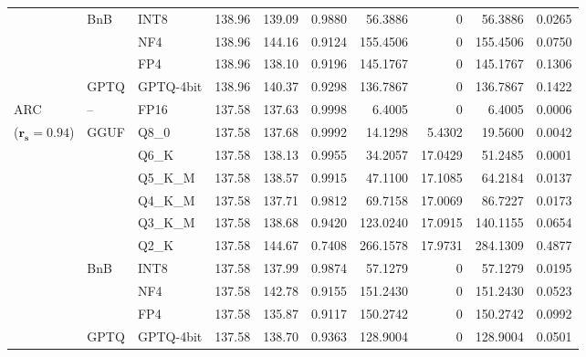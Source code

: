 \begin{longtable}{ll l rrrrrrr}
 & BnB & INT8 & 138.96 & 139.09 & 0.9880 & 56.3886 & \cellcolor{cyan!12} $0$ & 56.3886 & 0.0265 \\
 &  & NF4 & 138.96 & 144.16 & \cellcolor{red!18} 0.9124 & \cellcolor{red!18} 155.4506 & \cellcolor{cyan!12} $0$ & \cellcolor{red!18} 155.4506 & \cellcolor{red!18} 0.0750 \\
 &  & FP4 & 138.96 & 138.10 & \cellcolor{red!18} 0.9196 & \cellcolor{red!18} 145.1767 & \cellcolor{cyan!12} $0$ & \cellcolor{red!18} 145.1767 & \cellcolor{red!18} 0.1306 \\
 & GPTQ & GPTQ-4bit & 138.96 & 140.37 & \cellcolor{red!18} 0.9298 & \cellcolor{red!18} 136.7867 & \cellcolor{cyan!12} $0$ & \cellcolor{red!18} 136.7867 & \cellcolor{red!18} 0.1422 \\
\midrule
ARC & -- & FP16 & 137.58 & 137.63 & 0.9998 & 6.4005 & \cellcolor{cyan!12} $0$ & 6.4005 & 0.0006 \\
{\small ($\mathbf{r_s{=}0.94}$)} & GGUF & Q8\_0 & 137.58 & 137.68 & 0.9992 & 14.1298 & 5.4302 & 19.5600 & 0.0042 \\
 &  & Q6\_K & 137.58 & 138.13 & 0.9955 & 34.2057 & 17.0429 & 51.2485 & 0.0001 \\
 &  & Q5\_K\_M & 137.58 & 138.57 & 0.9915 & 47.1100 & 17.1085 & 64.2184 & 0.0137 \\
 &  & Q4\_K\_M & 137.58 & 137.71 & 0.9812 & 69.7158 & 17.0069 & 86.7227 & 0.0173 \\
 &  & Q3\_K\_M & 137.58 & 138.68 & \cellcolor{red!18} 0.9420 & \cellcolor{red!18} 123.0240 & 17.0915 & \cellcolor{red!18} 140.1155 & \cellcolor{red!18} 0.0654 \\
 &  & Q2\_K & 137.58 & 144.67 & \cellcolor{red!35} 0.7408 & \cellcolor{red!35} 266.1578 & 17.9731 & \cellcolor{red!35} 284.1309 & \cellcolor{red!35} 0.4877 \\
 & BnB & INT8 & 137.58 & 137.99 & 0.9874 & 57.1279 & \cellcolor{cyan!12} $0$ & 57.1279 & 0.0195 \\
 &  & NF4 & 137.58 & 142.78 & \cellcolor{red!18} 0.9155 & \cellcolor{red!18} 151.2430 & \cellcolor{cyan!12} $0$ & \cellcolor{red!18} 151.2430 & \cellcolor{red!18} 0.0523 \\
 &  & FP4 & 137.58 & 135.87 & \cellcolor{red!18} 0.9117 & \cellcolor{red!18} 150.2742 & \cellcolor{cyan!12} $0$ & \cellcolor{red!18} 150.2742 & \cellcolor{red!18} 0.0992 \\
 & GPTQ & GPTQ-4bit & 137.58 & 138.70 & \cellcolor{red!18} 0.9363 & \cellcolor{red!18} 128.9004 & \cellcolor{cyan!12} $0$ & \cellcolor{red!18} 128.9004 & \cellcolor{red!18} 0.0501 \\

\end{longtable}
